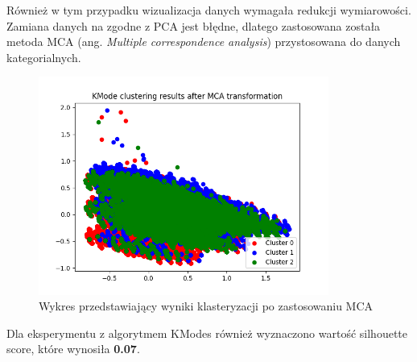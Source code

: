 \documentclass{classrep}
\begin{document}
{{{                Również w tym przypadku wizualizacja danych wymagała redukcji wymiarowości. Zamiana danych na zgodne z PCA jest błędne, dlatego zastosowana została metoda MCA (ang. \textit{Multiple correspondence analysis}) przystosowana do danych kategorialnych.
                
                 \begin{figure}[!htbp]
                    \centering
                    \includegraphics[width=0.85\textwidth]{img/clustering/mca.png}
                    \caption{Wykres przedstawiający wyniki klasteryzacji po zastosowaniu MCA}
                    \label{clust_mca}
                \end{figure}
                \FloatBarrier
                
               Dla eksperymentu z algorytmem KModes również wyznaczono wartość silhouette score, które wynosiła \textbf{0.07}.
                
}}}
\end{document}
